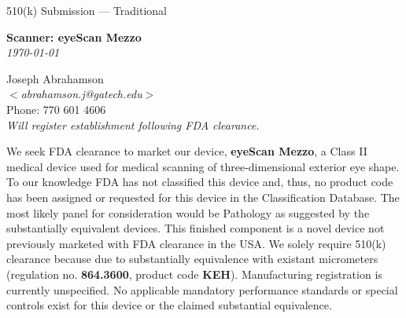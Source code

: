 \newpage
\singlespacing

\begin{flushright}
  \huge{510(k) Submission --- Traditional}\\[.5in]
  
  \begin{minipage}{0.8\textwidth}
    \begin{flushright}
      \large \textbf{Scanner: eyeScan Mezzo} \\
      \textit{\today}
    \end{flushright}
  \end{minipage}
\end{flushright}

\begin{flushleft}
  Joseph Abrahamson\\
  $<$\textit{abrahamson.j@gatech.edu}$>$ \\
  Phone: 770 601 4606 \\[1em]
  
  \textit{Will register establishment following FDA clearance.}
\end{flushleft}
\vspace{4em}

\onehalfspacing

We seek FDA clearance to market our device, \textbf{eyeScan Mezzo}, a
Class II medical device used for medical scanning of three-dimensional
exterior eye shape. To our knowledge FDA has not classified this
device and, thus, no product code has been assigned or requested for
this device in the Classification Database. The most likely panel for
consideration would be Pathology as suggested by the substantially
equivalent devices. This finished component is a novel device not
previously marketed with FDA clearance in the USA. We solely require
510(k) clearance because due to substantially equivalence with
existant micrometers (regulation no. \textbf{864.3600}, product code
\textbf{KEH}). Manufacturing registration is currently unspecified. No
applicable mandatory performance standards or special controls exist
for this device or the claimed substantial equivalence.

\newpage

